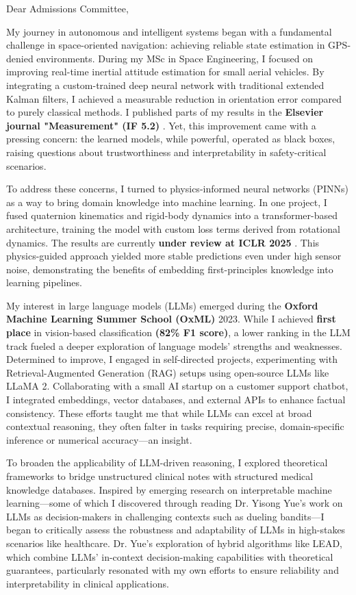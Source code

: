 \documentclass[a4,20pt]{article}
\begin{document}
\begin{large} 
Dear Admissions Committee,

My journey in autonomous and intelligent systems began with a fundamental challenge in space-oriented navigation: achieving reliable state estimation in GPS-denied environments. During my MSc in Space Engineering, I focused on improving real-time inertial attitude estimation for small aerial vehicles. By integrating a custom-trained deep neural network with traditional extended Kalman filters, I achieved a measurable reduction in orientation error compared to purely classical methods. I published parts of my results in the \textbf{Elsevier journal "Measurement" (IF 5.2)} \cite{golroudbari2023generalizable}. Yet, this improvement came with a pressing concern: the learned models, while powerful, operated as black boxes, raising questions about trustworthiness and interpretability in safety-critical scenarios.

To address these concerns, I turned to physics-informed neural networks (PINNs) as a way to bring domain knowledge into machine learning. In one project, I fused quaternion kinematics and rigid-body dynamics into a transformer-based architecture, training the model with custom loss terms derived from rotational dynamics. The results are currently \textbf{under review at ICLR 2025} \cite{golroudbari2024te}. This physics-guided approach yielded more stable predictions even under high sensor noise, demonstrating the benefits of embedding first-principles knowledge into learning pipelines. 

My interest in large language models (LLMs) emerged during the \textbf{Oxford Machine Learning Summer School (OxML)} 2023. While I achieved \textbf{first place} in vision-based classification \textbf{(82\% F1 score)}, a lower ranking in the LLM track fueled a deeper exploration of language models' strengths and weaknesses. Determined to improve, I engaged in self-directed projects, experimenting with Retrieval-Augmented Generation (RAG) setups using open-source LLMs like LLaMA 2. Collaborating with a small AI startup on a customer support chatbot, I integrated embeddings, vector databases, and external APIs to enhance factual consistency. These efforts taught me that while LLMs can excel at broad contextual reasoning, they often falter in tasks requiring precise, domain-specific inference or numerical accuracy—an insight.

To broaden the applicability of LLM-driven reasoning, I explored theoretical frameworks to bridge unstructured clinical notes with structured medical knowledge databases. Inspired by emerging research on interpretable machine learning—some of which I discovered through reading Dr. Yisong Yue’s work on LLMs as decision-makers in challenging contexts such as dueling bandits—I began to critically assess the robustness and adaptability of LLMs in high-stakes scenarios like healthcare. Dr. Yue’s exploration of hybrid algorithms like LEAD, which combine LLMs’ in-context decision-making capabilities with theoretical guarantees, particularly resonated with my own efforts to ensure reliability and interpretability in clinical applications.



\end{large}
\end{document}
